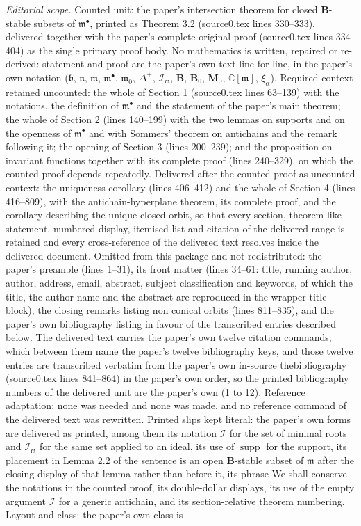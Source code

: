 \documentclass[10pt,a4paper]{amsart}
\newcommand{\supp}{\mathop{\mathrm{supp}}\nolimits}
\newcommand{\soc}[1]{\mathcal{I}_{#1}}
\newcommand{\group}[1]{\mathbf{#1}}
\numberwithin{equation}{section}
\theoremstyle{plain}
\theoremstyle{definition}
\theoremstyle{remark}
\begin{document}
\noindent\textit{Editorial scope.} Counted unit: the paper's intersection theorem for closed $\group{B}$-stable subsets of $\mathfrak{m}^{\bullet}$, printed as Theorem 3.2 (source0.tex lines 330--333), delivered together with the paper's complete original proof (source0.tex lines 334--404) as the single primary proof body. No mathematics is written, repaired or re-derived: statement and proof are the paper's own text line for line, in the paper's own notation ($\mathfrak{b}$, $\mathfrak{n}$, $\mathfrak{m}$, $\mathfrak{m}^{\bullet}$, $\mathfrak{m}_{0}$, $\Delta^{+}$, $\soc{\mathfrak{m}}$, $\group{B}$, $\group{B}_{0}$, $\group{M}_{0}$, $\mathbb{C}[\mathfrak{m}]$, $\xi_{\alpha}$). Required context retained uncounted: the whole of Section 1 (source0.tex lines 63--139) with the notations, the definition of $\mathfrak{m}^{\bullet}$ and the statement of the paper's main theorem; the whole of Section 2 (lines 140--199) with the two lemmas on supports and on the openness of $\mathfrak{m}^{\bullet}$ and with Sommers' theorem on antichains and the remark following it; the opening of Section 3 (lines 200--239); and the proposition on invariant functions together with its complete proof (lines 240--329), on which the counted proof depends repeatedly. Delivered after the counted proof as uncounted context: the uniqueness corollary (lines 406--412) and the whole of Section 4 (lines 416--809), with the antichain-hyperplane theorem, its complete proof, and the corollary describing the unique closed orbit, so that every section, theorem-like statement, numbered display, itemised list and citation of the delivered range is retained and every cross-reference of the delivered text resolves inside the delivered document. Omitted from this package and not redistributed: the paper's preamble (lines 1--31), its front matter (lines 34--61: title, running author, author, address, email, abstract, subject classification and keywords, of which the title, the author name and the abstract are reproduced in the wrapper title block), the closing remarks listing non conical orbits (lines 811--835), and the paper's own bibliography listing in favour of the transcribed entries described below. The delivered text carries the paper's own twelve citation commands, which between them name the paper's twelve bibliography keys, and those twelve entries are transcribed verbatim from the paper's own in-source thebibliography (source0.tex lines 841--864) in the paper's own order, so the printed bibliography numbers of the delivered unit are the paper's own (1 to 12). Reference adaptation: none was needed and none was made, and no reference command of the delivered text was rewritten. Printed slips kept literal: the paper's own forms are delivered as printed, among them its notation $\soc{}$ for the set of minimal roots and $\soc{\mathfrak{m}}$ for the same set applied to an ideal, its use of $\supp$ for the support, its placement in Lemma 2.2 of the sentence is an open $\group{B}$-stable subset of $\mathfrak{m}$ after the closing display of that lemma rather than before it, its phrase We shall conserve the notations in the counted proof, its double-dollar displays, its use of the empty argument $\soc{}$ for a generic antichain, and its section-relative theorem numbering. Layout and class: the paper's own class is 
\end{document}
